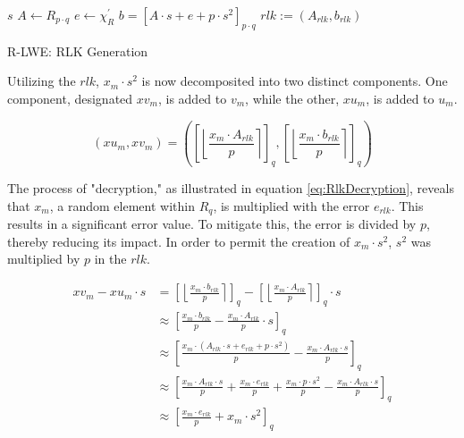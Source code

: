 \begin{algorithm}[htb]
  \begin{algorithmic}[1]
    \REQUIRE $s$
    \STATE $A \leftarrow R_{p \cdot q}$
    \STATE $e \leftarrow \chi_R^{'}$
    \STATE $b = [A\cdot s+e+p\cdot s^2]_{p \cdot q}$
    \RETURN $rlk:=(A_{rlk}, b_{rlk})$
  \end{algorithmic}
  \caption{R-LWE: RLK Generation}
  \label{alg:RingRLKGeneration}
\end{algorithm}

Utilizing the $rlk$, $x_m\cdot s^2$ is now decomposited into two distinct components. One component, designated $xv_m$, is added to $v_m$, while the other, $xu_m$, is added to $u_m$.

\begin{equation}
  (xu_m, xv_m) = \left(\left[\left\lfloor \frac{x_m \cdot A_{rlk}}{p}  \right\rceil \right]_q, \left[\left\lfloor \frac{x_m \cdot b_{rlk}}{p}  \right\rceil \right]_q\right)
  \label{eq:ringXmSplitting}
\end{equation}

The process of "decryption," as illustrated in equation \ref{eq:RlkDecryption}, reveals that $x_m$, a random element within $R_q$, is multiplied with the error $e_{rlk}$. This results in a significant error value. To mitigate this, the error is divided by $p$, thereby reducing its impact. In order to permit the creation of $x_m \cdot s^2$, $s^2$ was multiplied by $p$ in the $rlk$.

\begin{equation}
  \begin{split}
    xv_m - xu_m \cdot s & = \left[\left\lfloor \frac{x_m \cdot b_{rlk}}{p}  \right\rceil \right]_q - \left[\left\lfloor \frac{x_m \cdot A_{rlk}}{p}  \right\rceil \right]_q \cdot s  \\
                        & \approx \left[\frac{x_m \cdot b_{rlk}}{p} - \frac{x_m \cdot A_{rlk}}{p} \cdot s\right]_q                                                                   \\
                        & \approx \left[\frac{x_m \cdot (A_{rlk}\cdot s+e_{rlk}+p\cdot s^2)}{p} - \frac{x_m \cdot A_{rlk} \cdot s}{p}\right]_q                                       \\
                        & \approx \left[\frac{x_m \cdot A_{rlk}\cdot s}{p}+\frac{x_m \cdot e_{rlk}}{p}+\frac{x_m \cdot p\cdot s^2}{p} - \frac{x_m \cdot A_{rlk} \cdot s}{p}\right]_q \\
                        & \approx \left[\frac{x_m \cdot e_{rlk}}{p}+ x_m \cdot s^2 \right]_q
  \end{split}
  \label{eq:RlkDecryption}
\end{equation}

